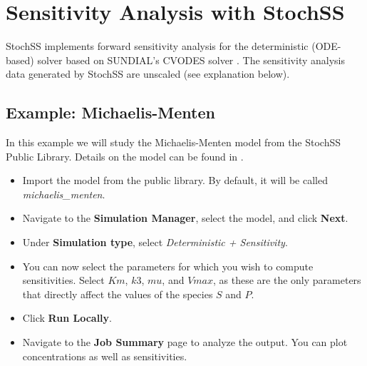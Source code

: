 \chapter{Sensitivity Analysis with StochSS}

%

StochSS implements forward sensitivity analysis for the deterministic (ODE-based) solver based on SUNDIAL's CVODES solver \cite{sundials}. The sensitivity analysis data generated by StochSS are unscaled (see explanation below).

\section{Example: Michaelis-Menten}

In this example we will study the Michaelis-Menten model from the StochSS Public Library. Details on the model can be found in \cite{wiki-michaelis-menten}.%
\begin{itemize}
\item Import the model from the public library. By default, it will be called \textit{michaelis\_menten}.
\item Navigate to the \textbf{Simulation Manager}, select the model, and click \textbf{Next}.
\item Under \textbf{Simulation type}, select \textit{Deterministic + Sensitivity}.
\item You can now select the parameters for which you wish to compute sensitivities. Select $Km$, $k3$, $mu$, and $Vmax$, as these are the only parameters that directly affect the values of the species $S$ and $P$.
\item Click \textbf{Run Locally}. 
\item Navigate to the \textbf{Job Summary} page to analyze the output. You can plot concentrations as well as sensitivities.
\end{itemize}

